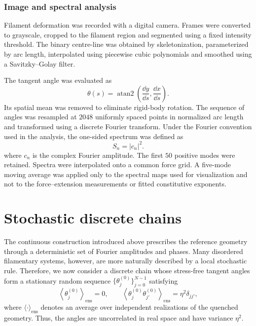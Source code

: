 \documentclass[pdflatex, twocolumn, sn-nature]{sn-jnl}
\begin{document}
\subsubsection*{Image and spectral analysis}

Filament deformation was recorded with a digital camera. Frames were converted to grayscale, cropped to the filament region and segmented using a fixed intensity threshold. The binary centre-line was obtained by skeletonization, parameterized by arc length, interpolated using piecewise cubic polynomials and smoothed using a Savitzky--Golay filter.

The tangent angle was evaluated as
\begin{equation}
\theta(s)
=
\operatorname{atan2}
\left(
\frac{\dd y}{\dd s},
\frac{\dd x}{\dd s}
\right).
\end{equation}
Its spatial mean was removed to eliminate rigid-body rotation. The sequence of angles was resampled at $2048$ uniformly spaced points in normalized arc length and transformed using a discrete Fourier transform. Under the Fourier convention used in the analysis, the one-sided spectrum was defined as
\begin{equation}
S_n=|c_n|^2.
\end{equation}
where $c_n$ is the complex Fourier amplitude.
The first $50$ positive modes were retained. Spectra were interpolated onto a common force grid. A five-mode moving average was applied only to the spectral maps used for visualization and not to the force--extension measurements or fitted constitutive exponents.

\newpage


\section{Stochastic discrete chains}
\label{sec:stochastic_main}
The continuous construction introduced above prescribes the reference
geometry through a deterministic set of Fourier amplitudes and phases.
Many disordered filamentary systems, however, are more naturally
described by a local stochastic rule. 
Therefore, we now consider a discrete chain whose stress-free tangent angles form a stationary random sequence $\{\theta_j^{(0)}\}_{j=0}^{N-1}$ satisfying
\begin{equation}
    \left\langle \theta_j^{(0)} \right\rangle_{\mathrm{ens}}=0,
    \qquad
    \left\langle
    \theta_j^{(0)}\theta_{j'}^{(0)}
    \right\rangle_{\mathrm{ens}}
    =
    \eta^2\delta_{jj'} ,
\end{equation}
where $\langle\cdot\rangle_{\mathrm{ens}}$ denotes an average over
independent realizations of the quenched geometry. Thus, the angles are
uncorrelated in real space and have variance $\eta^2$.
\end{document}
